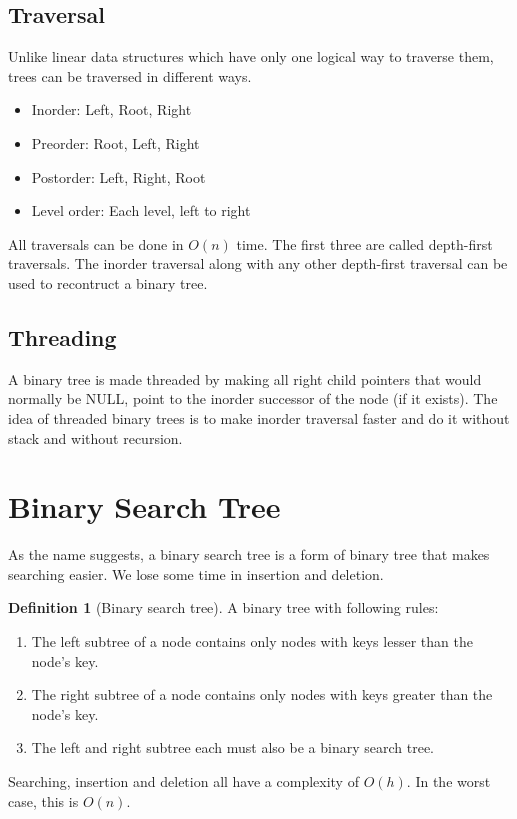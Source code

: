\documentclass[10pt, a4paper]{extarticle}
\theoremstyle{definition}
\newtheorem{defn}{Definition}
\begin{document}
	\subsection{Traversal}
	Unlike linear data structures which have only one logical way to traverse them, trees can be traversed in different ways.
	\begin{itemize}
		\item Inorder: Left, Root, Right
		\item Preorder: Root, Left, Right
		\item Postorder: Left, Right, Root
		\item Level order: Each level, left to right
	\end{itemize}
	All traversals can be done in $O(n)$ time. The first three are called depth-first traversals. The inorder traversal along with any other depth-first traversal can be used to recontruct a binary tree.
	\subsection{Threading}
	A binary tree is made threaded by making all right child pointers that would normally be NULL, point to the inorder successor of the node (if it exists). The idea of threaded binary trees is to make inorder traversal faster and do it without stack and without recursion.

	\section{Binary Search Tree}
	As the name suggests, a binary search tree is a form of binary tree that makes searching easier. We lose some time in insertion and deletion.

	\begin{defn}[Binary search tree]
		A binary tree with following rules:
		\begin{enumerate}
			\item The left subtree of a node contains only nodes with keys lesser than the node’s key.
			\item The right subtree of a node contains only nodes with keys greater than the node’s key.
			\item The left and right subtree each must also be a binary search tree. 
	\end{enumerate}
	\end{defn}
	Searching, insertion and deletion all have a complexity of $O(h)$. In the worst case, this is $O(n)$.
\end{document}
